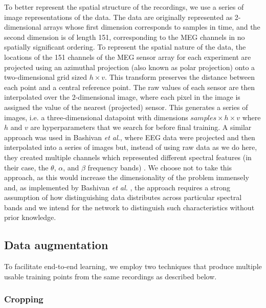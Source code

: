 \documentclass[utf8]{frontiersSCNS} %
\begin{document}
To better represent the spatial structure of the recordings, we use a series of image representations of the data. The data are originally represented as 2-dimensional arrays whose first dimension corresponds to samples in time, and the second dimension is of length 151, corresponding to the MEG channels in no spatially significant ordering. To represent the spatial nature of the data, the locations of the 151 channels of the MEG sensor array for each experiment are projected using an azimuthal projection (also known as polar projection) onto a two-dimensional grid sized $h \times v$. This transform preserves the distance between each point and a central reference point. The raw values of each sensor are then interpolated over the 2-dimensional image, where each pixel in the image is assigned the value of the nearest (projected) sensor. This generates a series of images, i.e. a three-dimensional datapoint with dimensions $samples \times  h \times v$ where $h$ and $v$ are hyperparameters that we search for before final training. A similar approach was used in Bashivan {\em et al.}, where EEG data were projected and then interpolated into a series of images but, instead of using raw data as we do here, they created multiple channels which represented different spectral features (in their case, the $\theta$, $\alpha$, and $\beta$ frequency bands) \cite{Bashivan2016}. We choose not to take this approach, as this would increase the dimensionality of the problem immensely and, as implemented by Bashivan {\em et al.} \cite{Bashivan2016}, the approach requires a strong assumption of how distinguishing data distributes across particular spectral bands and we intend for the network to distinguish such characteristics without prior knowledge.

\subsection{Data augmentation}

To facilitate end-to-end learning, we employ two techniques that produce multiple usable training points from the same recordings as described below. 

\subsubsection{Cropping}
\end{document}
